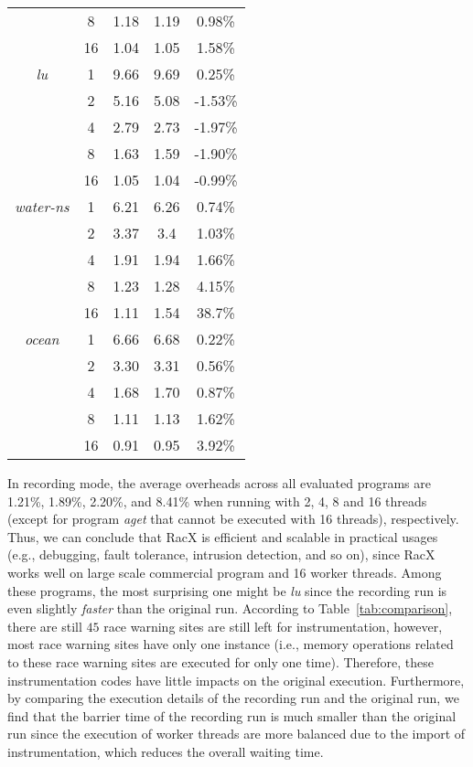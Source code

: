 \documentclass[10pt,onecolumn,letterpaper]{article}
\begin{document}
\begin{table}
{\begin{tabular}{|c|c|c|c|c|}
\cline{2-5}  &8&1.18&1.19&0.98\%\\
\cline{2-5}  &16&1.04&1.05&1.58\%\\
\hline \hline \emph{lu}&1&9.66&9.69&0.25\%\\
\cline{2-5}  &2&5.16&5.08&-1.53\%\\
\cline{2-5}  &4&2.79&2.73&-1.97\%\\
\cline{2-5}  &8&1.63&1.59&-1.90\%\\
\cline{2-5}  &16&1.05&1.04&-0.99\%\\
\hline \hline \emph{water-ns}&1&6.21&6.26&0.74\%\\
\cline{2-5}  &2&3.37&3.4&1.03\%\\
\cline{2-5}  &4&1.91&1.94&1.66\%\\
\cline{2-5}  &8&1.23&1.28&4.15\%\\
\cline{2-5}  &16&1.11&1.54&38.7\%\\
\hline \hline \emph{ocean}&1&6.66&6.68&0.22\%\\
\cline{2-5}  &2&3.30&3.31&0.56\%\\
\cline{2-5}  &4&1.68&1.70&0.87\%\\
\cline{2-5}  &8&1.11&1.13&1.62\%\\
\cline{2-5}  &16&0.91&0.95&3.92\%\\
\hline
\end{tabular}}
\end{table}

In recording mode, the average overheads across all evaluated
programs are 1.21\%, 1.89\%, 2.20\%, and 8.41\% when running with 2,
4, 8 and 16 threads (except for program \emph{aget} that cannot be
executed with 16 threads), respectively. Thus, we can conclude that
RacX is efficient and scalable in practical usages (e.g., debugging,
fault tolerance, intrusion detection, and so on), since RacX works
well on large scale commercial program and 16 worker threads. Among
these programs, the most surprising one might be \emph{lu} since the
recording run is even slightly \emph{faster} than the original run.
According to Table~\ref{tab:comparison}, there are still $45$ race
warning sites are still left for instrumentation, however, most race
warning sites have only one instance (i.e., memory operations
related to these race warning sites are executed for only one time).
Therefore, these instrumentation codes have little impacts on the
original execution. Furthermore, by comparing the execution details
of the recording run and the original run, we find that the barrier
time of the recording run is much smaller than the original run
since the execution of worker threads are more balanced due to the
import of instrumentation, which reduces the overall waiting time.
\end{document}

